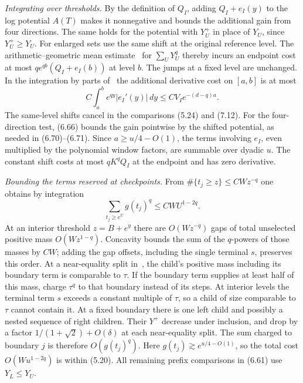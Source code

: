 \documentclass[11pt]{article}
\theoremstyle{definition}
\begin{document}
\smallskip\noindent\emph{Integrating over thresholds.}
By the definition of \(Q_I\), adding \(Q_I+e_I(y)\) to the log potential
\(A(T)\) makes it nonnegative and bounds the additional gain from
four directions. The same holds for the potential with \(Y_U^+\) in
place of \(Y_U\), since \(Y_U^+\ge Y_U\). For enlarged sets use the
same shift at the original reference level. The arithmetic--geometric mean estimate~\cite[(5.1)]{JH} for
\(\sum_U Y_U^q\) thereby incurs an endpoint cost at most
\(q e^{qb}(Q_I+e_I(b))\) at level \(b\). The jumps at a fixed level
are unchanged. In the integration by parts of~\cite[(5.4)]{JH} the
additional derivative cost on \([a,b]\) is at most
\[
 C\int_a^b e^{qy}|e_I'(y)|\,dy\le C V_I e^{-(d-q)a}.
\]
The same-level shifts cancel in the comparisons (5.24) and (7.12).
For the four-direction test, (6.66) bounds the gain pointwise by the shifted
potential, as needed in (6.70)--(6.71). Since \(a\ge u/4-O(1)\), the
terms involving \(e_I\), even multiplied by the polynomial window
factors, are summable over dyadic \(u\). The constant shift costs at
most \(qK^q Q_I\) at the endpoint and has zero derivative.

\smallskip\noindent\emph{Bounding the terms reserved at checkpoints.} From \(\#\{t_j\ge z\}\le C Wz^{-q}\) one
obtains by integration
\[
 \sum_{t_j\ge e^U}g(t_j)^q\le CW U^{1-2q}.
\]
At an interior threshold \(z=B+e^y\) there are \(O(Wz^{-q})\) gaps
of total unselected positive mass \(O(Wz^{1-q})\). Concavity bounds
the sum of the \(q\)-powers of those masses by \(CW\); adding the
gap offsets, including the single terminal \(s\), preserves this
order. At a near-equality split in~\cite[(5.21)]{JH}, the child's
positive mass including its boundary term is comparable to \(\tau\).
If the boundary term supplies at least half of this
mass, charge \(\tau^q\) to that boundary instead of its steps.
At interior levels the terminal term \(s\) exceeds a constant
multiple of \(\tau\), so a child of size comparable to \(\tau\) cannot
contain it. At a
fixed boundary there is one left child and possibly a nested sequence
of right children. Their \(Y^+\) decrease under inclusion, and drop
by a factor \(1/(1+\sqrt2)+O(\delta)\) at each near-equality split. The sum
charged to boundary \(j\) is therefore \(O(g(t_j)^q)\). Here
\(g(t_j)\gtrsim e^{u/4-O(1)}\), so the total cost \(O(Wu^{1-2q})\)
is within (5.20). All remaining prefix comparisons in (6.61) use
\(Y_L\le Y_U\).
\end{document}
